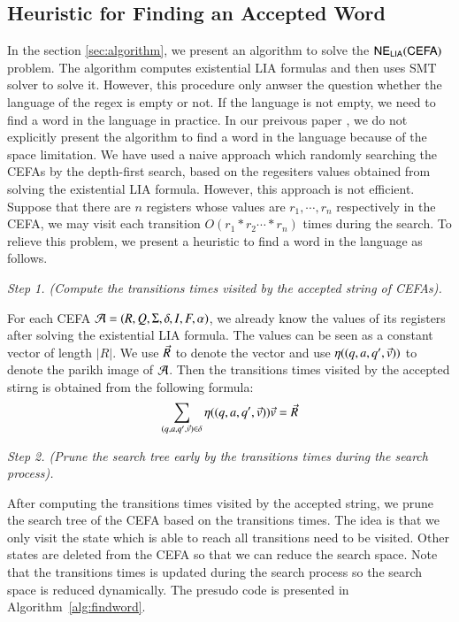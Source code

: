 \subsection{Heuristic for Finding an Accepted Word}
In the section \ref{sec:algorithm}, we present an algorithm to solve the ${\sf NE_{LIA}(CEFA)}$ problem. The algorithm computes existential LIA formulas and then uses SMT solver to solve it. However, this procedure only anwser the question whether the language of the regex is empty or not. If the language is not empty, we need to find a word in the language in practice. In our preivous paper \cite{Denghang2023}, we do not explicitly present the algorithm to find a word in the language because of the space limitation. We have used a naive approach which randomly searching the CEFAs by the depth-first search, based on the regesiters values obtained from solving the existential LIA formula. However, this approach is not efficient. Suppose that there are $n$ registers whose values are $r_1,\cdots, r_n$ respectively in the CEFA, we may visit each transition $O(r_1*r_2\cdots *r_n)$ times during the search. To relieve this problem, we present a heuristic to find a word in the language as follows.

\medskip
\noindent
\emph{Step 1. (Compute the transitions times visited by the accepted string of CEFAs).}

For each CEFA $\mathcal{A} = (R, Q, \Sigma, \delta, I, F, \alpha)$, we already know the values of its registers after solving the existential LIA formula. The values can be seen as a constant vector of length $|R|$. We use $\vec{R}$ to denote the vector and use $\eta((q, a, q', \vec{v}))$ to denote the parikh image of $\mathcal{A}$. Then the transitions times visited by the accepted stirng is obtained from the following formula:
$$ \sum \limits_{(q, a, q', \vec{v})\in \delta} \eta((q, a, q', \vec{v}))\vec{v} = \vec{R}$$

\medskip
\noindent
\emph{Step 2. (Prune the search tree early by the transitions times during the search process).}

After computing the transitions times visited by the accepted string, we prune the search tree of the CEFA based on the transitions times. The idea is that we only visit the state which is able to reach all transitions need to be visited. Other states are deleted from the CEFA so that we can reduce the search space.
Note that the transitions times is updated during the search process so the search space is reduced dynamically. The presudo code is presented in Algorithm~\ref{alg:findword}.


